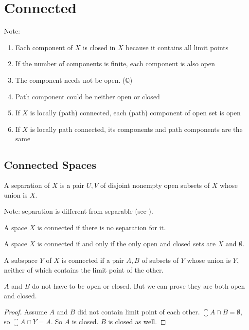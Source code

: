 \chapter{Connected}



Note: 
\begin{enumerate}
    \item Each component of $X$ is closed in $X$ because it contains all limit points
    \item If the number of components is finite, each component is also open
    \item The component needs not be open. ($\mathbb{Q}$)
    \item Path component could be neither open or closed
    \item If $X$ is locally (path) connected, each (path) component of open set is open
    \item If $X$ is locally path connected, its components and path components are the same
\end{enumerate}


\section{Connected Spaces}

\begin{definition}\label{separation}
    A separation of $X$ is a pair $U,V$ of disjoint nonempty open subsets of $X$ whose union is $X$.
    
    
    Note: separation is different from separable (see ).
\end{definition}

\begin{definition}
    A space $X$ is connected if there is no separation for it.
\end{definition}

\begin{theorem}
    A space $X$ is connected if and only if the only open and closed sets are $X$ and $\emptyset$.
\end{theorem}

\begin{theorem}
    A subspace $Y$ of $X$ is connected if a pair $A,B$ of subsets of $Y$ whose union is $Y$, neither of which contains the limit point of the other.
    
    $A$ and $B$ do not have to be open or closed. But we can prove they are both open and closed.
\end{theorem}
\begin{proof}
    Assume $A$ and $B$ did not contain limit point of each other. $\closure{A} \cap B = \emptyset$, so $\closure{A} \cap Y = A$. So $A$ is closed. $B$ is closed as well.
\end{proof}

